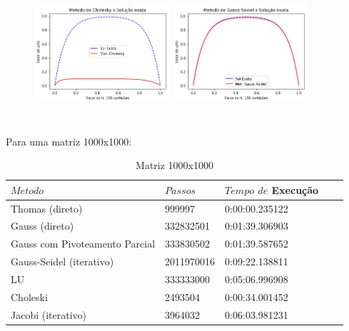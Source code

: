 \documentclass{article}
\begin{document}
\begin{itemize}
\begin{figure}[!htb]
\includegraphics [width=5cm,height=5cm]{Cho100part.png}
\includegraphics [width=5cm,height=5cm]{GS100part.png}
\end{figure}

\newpage

\text Para uma matriz 1000x1000:

\begin{table}[h]
\centering
  \begin{tabular}{l||l|lll}
    $Metodo$ & $Passos$ & $Tempo$ $de$ Execução \\
    \hline
    Thomas (direto) & 999997  & 0:00:00.235122 \\
    
    Gauss (direto) & 332832501 & 0:01:39.306903\\
    
    Gauss com Pivoteamento Parcial & 333830502 & 0:01:39.587652\\
    
    Gauss-Seidel (iterativo) & 2011970016 &  0:09:22.138811 \\
    
    LU & 333333000 & 0:05:06.996908 \\
    
    Choleski & 2493504  &  0:00:34.001452 \\
    
    Jacobi (iterativo) & 3964032 & 0:06:03.981231  \\
    \hline
  \end{tabular}
  \caption{Matriz 1000x1000}
\end{table}


\end{itemize}
\end{document}
